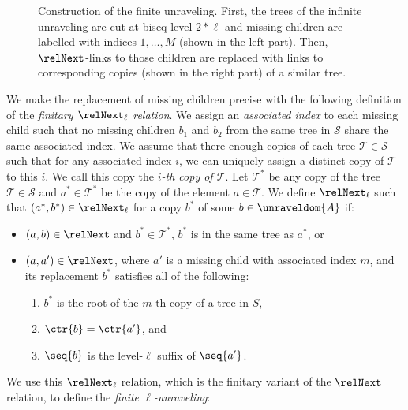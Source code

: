\begin{figure}
  \centering
  
  \caption{Construction of the finite unraveling. First, the trees of the infinite unraveling are cut at biseq level $2*\ell$ and missing children are labelled with indices $1, \ldots, M$ (shown in the left part). Then, $\relNext$-links to those children are replaced with links to corresponding copies (shown in the right part) of a similar tree.}
  \label{fig:finite-unraveling}
\end{figure}

We make the replacement of missing children precise with the following definition of the \emph{finitary $\relNext_{\ell}$ relation}.
We assign an \emph{associated index} to each missing child such that no missing children $b_{1}$ and $b_{2}$ from the same tree in $\mathcal{S}$ share the same associated index.
We assume that there enough copies of each tree $\mathcal{T} \in \mathcal{S}$ such that for any associated index $i$, we can uniquely assign a distinct copy of $\mathcal{T}$ to this $i$.
We call this copy the \emph{$i$-th copy of $\mathcal{T}$}.
Let $\mathcal{T}^{*}$ be any copy of the tree $\mathcal{T} \in \mathcal{S}$ and $a^{*} \in \mathcal{T}^{*}$ be the copy of the element $a \in \mathcal{T}$.
We define $\relNext_{\ell}$ such that $(a^{*}, b^{*}) \in \relNext_{\ell}$ for a copy $b^{*}$ of some $b \in \unraveldom{A}$ if:
  \begin{itemize}
    \item $(a,b) \in \relNext$ and $b^{*} \in \mathcal{T}^{*}$, \ie{} $b^{*}$ is in the same tree as $a^{*}$, or
    \item
          $(a,a') \in \relNext$, where $a'$ is a missing child with associated index $m$, and its replacement $b^{*}$ satisfies all of the following:
          \begin{enumerate}
            \item $b^{*}$ is the root of the $m$-th copy of a tree in $S$,
            \item $\ctr{b} = \ctr{a'}$, and
            \item $\seq{b}$ is the level-$\ell$ suffix of $\seq{a'}$.
          \end{enumerate}
  \end{itemize}
We use this $\relNext_{\ell}$ relation, which is the finitary variant of the $\relNext$ relation, to define the \emph{finite $\ell$-unraveling}:
